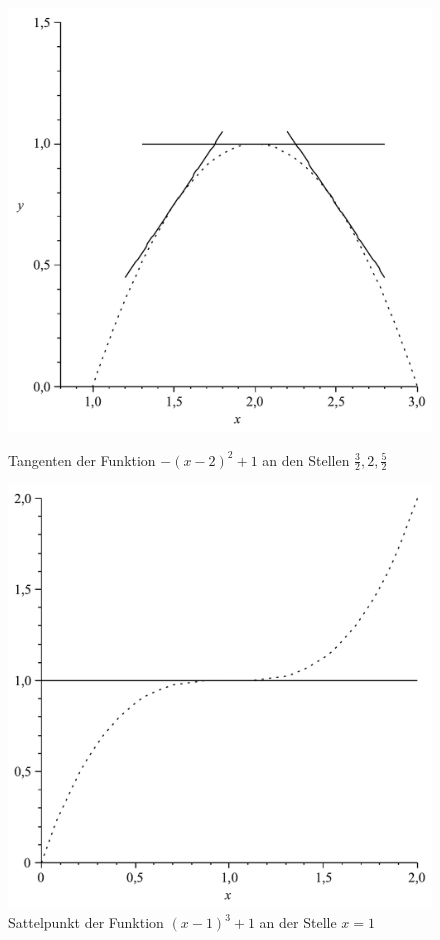 \begin{figure}
\begin{center}
    \begin{minipage}[b]{.4\textwidth}
    \begin{center}
        \includegraphics[width=.8\textwidth]{img/tangenten}
    \end{center}
    \caption{Tangenten der Funktion $-(x-2)^2+1$ an den Stellen $\frac{3}{2},2, \frac{5}{2}$}
    \label{fig:tangenten}
    \end{minipage}
    \hspace{.1\textwidth}
    \begin{minipage}[b]{.41\textwidth}
    \begin{center}
        \includegraphics[width=.8\textwidth]{img/sattelpunkt}
    \end{center}

    \caption{Sattelpunkt der Funktion $(x-1)^3+1$ an der Stelle $x=1$}
    \label{fig:sattelpunkt}
    \end{minipage}
\end{center}

\end{figure}
\newpage
